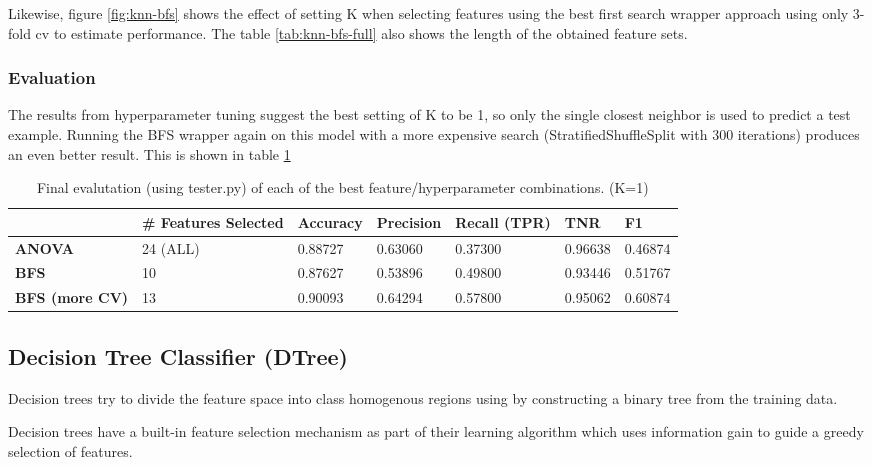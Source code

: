\documentclass{article}
\begin{document}
Likewise, figure \ref{fig:knn-bfs} shows the effect of setting K when selecting features using the best first search wrapper approach using only 3-fold cv to estimate performance. The table \ref{tab:knn-bfs-full} also shows the length of the obtained feature sets.

\subsubsection{Evaluation}

The results from hyperparameter tuning suggest the best setting of K to be 1, so only the single closest neighbor is used to predict a test example. Running the BFS wrapper again on this model with a more expensive search (StratifiedShuffleSplit with 300 iterations) produces an even better result. This is shown in table \ref{tab:knn-results}

\begin{table}[H]
\centering
\caption{Final evalutation (using tester.py) of each of the best feature/hyperparameter combinations. (K=1)}
\label{tab:knn-results}
\begin{tabular}{|l|l|l|l|l|l|l|}
\hline
                       & \textbf{\# Features Selected} & \textbf{Accuracy} & \textbf{Precision} & \textbf{Recall (TPR)} & \textbf{TNR} & \textbf{F1} \\ \hline
\textbf{ANOVA}         & 24 (ALL)                      & 0.88727           & 0.63060            & 0.37300               & 0.96638      & 0.46874     \\ \hline
\textbf{BFS}           & 10                            & 0.87627           & 0.53896            & 0.49800               & 0.93446      & 0.51767     \\ \hline
\textbf{BFS (more CV)} & 13                            & 0.90093           & 0.64294            & 0.57800               & 0.95062      & 0.60874     \\ \hline
\end{tabular}
\end{table}
\subsection{Decision Tree Classifier (DTree)}

Decision trees try to divide the feature space into class homogenous regions using by constructing a binary tree from the training data. 

Decision trees have a built-in feature selection mechanism as part of their learning algorithm which uses information gain to guide a greedy selection of features.
\end{document}

